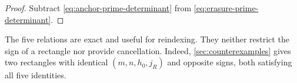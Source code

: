 \begin{proof}
Subtract \eqref{eq:anchor-prime-determinant} from
\eqref{eq:erasure-prime-determinant}.
\end{proof}

\begin{remark}
\label{rem:determinants-not-estimates}
The five relations are exact and useful for reindexing.  They neither
restrict the sign of a rectangle nor provide cancellation.  Indeed,
\cref{sec:counterexamples} gives two rectangles with identical
\((m,n,h_0,j_R)\) and opposite signs, both satisfying all five
identities.
\end{remark}
